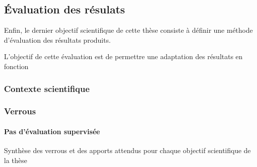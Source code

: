 \subsection{Évaluation des résulats}
\label{subsec:2-1-5}

Enfin, le dernier objectif scientifique de cette thèse consiste à
définir une méthode d'évaluation des résultats produits.

L'objectif de cette évaluation est de permettre une adaptation des
résultats en fonction 

\subsubsection{Contexte scientifique}

\subsubsection{Verrous}

\paragraph{Pas d'évaluation supervisée}


\begin{table}[h]
  \centering
  
  \caption{Synthèse des verrous et des apports attendus pour chaque
    objectif scientifique de la thèse}
  \label{tab:synthese_objectifs}
\end{table}

